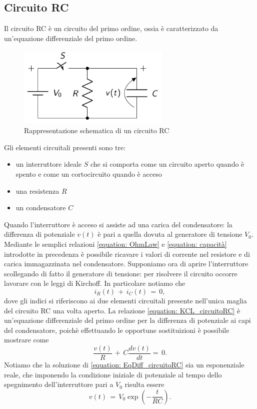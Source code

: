 \subsection{Circuito RC}

Il circuito RC è un circuito del primo ordine, ossia è caratterizzato da un'equazione differenziale del primo ordine. 
\begin{figure}[H]
    \centering
    \includegraphics[width=0.65\textwidth]{Immagini/CircuitoRC.png}
    \caption{Rappresentazione schematica di un circuito RC}
    \label{figure: CircuitoRC}
\end{figure}
Gli elementi circuitali presenti sono tre:
\begin{itemize}
    \item un interruttore ideale $S$ che si comporta come un circuito aperto quando è spento e come un cortocircuito quando
    è acceso
    \item una resistenza $R$
    \item un condensatore $C$
\end{itemize}
Quando l'interruttore è acceso si assiste ad una carica del condensatore: la differenza di potenziale $v(t)$ è pari a quella
dovuta al generatore di tensione $V_0$. Mediante le semplici relazioni \eqref{equation: OhmLaw} e \eqref{equation: capacità}
introdotte in precedenza è possibile ricavare i valori di corrente nel resistore e di carica immagazzinata nel condensatore.
Supponiamo ora di aprire l'interruttore scollegando di fatto il generatore di tensione: per risolvere il circuito occorre
lavorare con le leggi di Kirchoff. In particolare notiamo che
\begin{equation}
    i_R\left(t\right)\,+\,i_C\left(t\right)\,=\,0,
    \label{equation: KCL_circuitoRC}
\end{equation}
dove gli indici si riferiscono ai due elementi circuitali presente nell'unica maglia del circuito RC una volta aperto.
La relazione \eqref{equation: KCL_circuitoRC} è un'equazione differenziale del primo ordine per la differenza di potenziale
ai capi del condensatore, poichè effettuando le opportune sostituizioni è possibile mostrare come 
\begin{equation}
    \frac{v\left(t\right)}{R}\,+\,C\frac{dv\left(t\right)}{dt}=\,0.
    \label{equation: EqDiff_circuitoRC}
\end{equation}
Notiamo che la soluzione di \eqref{equation: EqDiff_circuitoRC} sia un esponenziale reale, che imponendo la condizione iniziale
di potenziale al tempo dello spegnimento dell'interruttore pari a $V_0$ risulta essere
\begin{equation}
    v\left(t\right)\,=\,V_0\exp{\left(-\frac{t}{RC}\right)}.
    \label{equation: solEqDiff_circuitoRC}
\end{equation}


